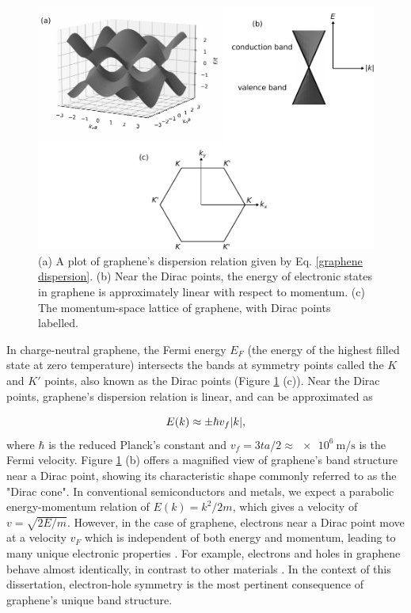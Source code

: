 \documentclass[double,12pt,1in]{beavtex}
\begin{document}
\begin{figure}
    \includegraphics[width = 1\textwidth]{Graphene band structure 3D.pdf}
    \caption{(a) A plot of graphene's dispersion relation given by Eq. \ref{graphene dispersion}. (b) Near the Dirac points, the energy of electronic states in graphene is approximately linear with respect to momentum. (c) The momentum-space lattice of graphene, with Dirac points labelled.}
    \label{graphene dispersion plot}
\end{figure}
In charge-neutral graphene, the Fermi energy $E_F$ (the energy of the highest filled state at zero temperature) intersects the bands at symmetry points called the $K$ and $K'$ points, also known as the Dirac points (Figure \ref{graphene dispersion plot} (c)). Near the Dirac points, graphene's dispersion relation is linear, and can be approximated as


\begin{equation}
    E(k) \approx \pm \hbar v_f \abs{k}, \label{linear dispersion of graphene}
\end{equation}
where $\hbar$ is the reduced Planck's constant and $v_f = 3ta/2  \approx \SI{e6}{\meter/\second}$ is the Fermi velocity. Figure \ref{graphene dispersion plot} (b) offers a magnified view of graphene's band structure near a Dirac point, showing its characteristic shape commonly referred to as the "Dirac cone". In conventional semiconductors and metals, we expect a parabolic energy-momentum relation of $E(k) = k^2/2m$, which gives a velocity of $v = \sqrt{2E/m}$. However, in the case of graphene, electrons near a Dirac point move at a velocity $v_F$ which is independent of both energy and momentum, leading to many unique electronic properties \cite{castro_neto_electronic_2009}. For example, electrons and holes in graphene behave almost identically, in contrast to other materials \cite{novoselov_electronic_2007,castro_neto_electronic_2009}. In the context of this dissertation, electron-hole symmetry is the most pertinent consequence of graphene’s unique band structure.
\end{document}
